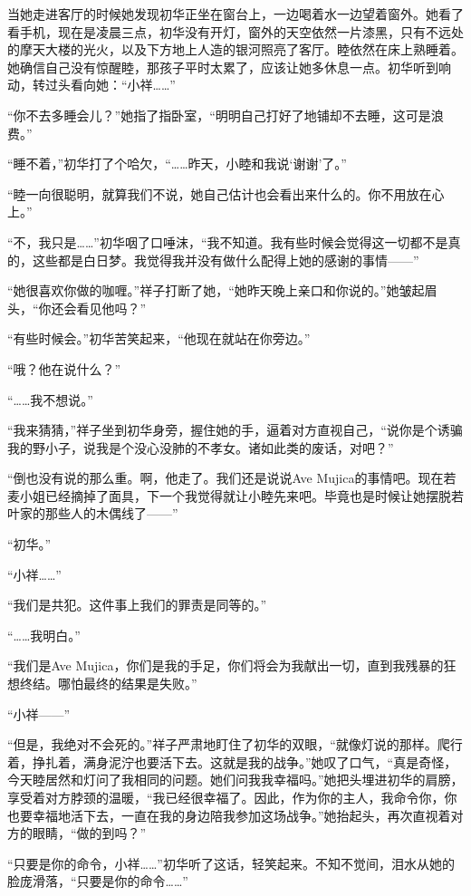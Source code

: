 \documentclass{article}
\begin{document}
\newpage



当她走进客厅的时候她发现初华正坐在窗台上，一边喝着水一边望着窗外。她看了看手机，现在是凌晨三点，初华没有开灯，窗外的天空依然一片漆黑，只有不远处的摩天大楼的光火，以及下方地上人造的银河照亮了客厅。睦依然在床上熟睡着。她确信自己没有惊醒睦，那孩子平时太累了，应该让她多休息一点。初华听到响动，转过头看向她：“小祥……”



“你不去多睡会儿？”她指了指卧室，“明明自己打好了地铺却不去睡，这可是浪费。”



“睡不着，”初华打了个哈欠，“……昨天，小睦和我说‘谢谢’了。”



“睦一向很聪明，就算我们不说，她自己估计也会看出来什么的。你不用放在心上。”



“不，我只是……”初华咽了口唾沫，“我不知道。我有些时候会觉得这一切都不是真的，这些都是白日梦。我觉得我并没有做什么配得上她的感谢的事情——”



“她很喜欢你做的咖喱。”祥子打断了她，“她昨天晚上亲口和你说的。”她皱起眉头，“你还会看见他吗？”



“有些时候会。”初华苦笑起来，“他现在就站在你旁边。”



“哦？他在说什么？”



“……我不想说。”



“我来猜猜，”祥子坐到初华身旁，握住她的手，逼着对方直视自己，“说你是个诱骗我的野小子，说我是个没心没肺的不孝女。诸如此类的废话，对吧？”



“倒也没有说的那么重。啊，他走了。我们还是说说Ave Mujica的事情吧。现在若麦小姐已经摘掉了面具，下一个我觉得就让小睦先来吧。毕竟也是时候让她摆脱若叶家的那些人的木偶线了——”



“初华。”



“小祥……”



“我们是共犯。这件事上我们的罪责是同等的。”



“……我明白。”



“我们是Ave Mujica，你们是我的手足，你们将会为我献出一切，直到我残暴的狂想终结。哪怕最终的结果是失败。”



“小祥——”



“但是，我绝对不会死的。”祥子严肃地盯住了初华的双眼，“就像灯说的那样。爬行着，挣扎着，满身泥泞也要活下去。这就是我的战争。”她叹了口气，“真是奇怪，今天睦居然和灯问了我相同的问题。她们问我我幸福吗。”她把头埋进初华的肩膀，享受着对方脖颈的温暖，“我已经很幸福了。因此，作为你的主人，我命令你，你也要幸福地活下去，一直在我的身边陪我参加这场战争。”她抬起头，再次直视着对方的眼睛，“做的到吗？”



“只要是你的命令，小祥……”初华听了这话，轻笑起来。不知不觉间，泪水从她的脸庞滑落，“只要是你的命令……”
\end{document}
